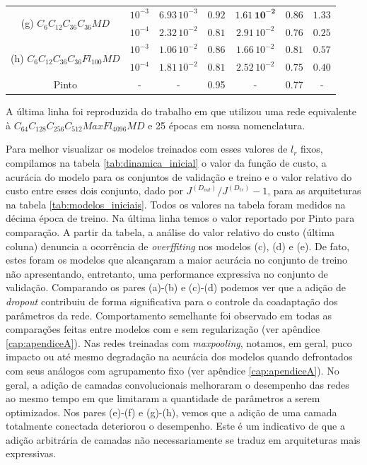 \begin{table}[ht]
\begin{center}
\begin{tabular}{ |c|c|c|c|c|c|c| }
			\hline\hline
			\multirow{2}{*}{(g) $C_6C_{12}C_{36}C_{36}MD$}
			& $10^{-3}$ & $6.93\,10^{-3}$ & $0.92$ & $\mathbf{1.61\,10^{-2}}$ & $\mathbf{0.86}$ & $1.33$ \\ \cline{2-7}
			& $10^{-4}$ & $2.32\,10^{-2}$ & $0.81$ & $2.91\,10^{-2}$ & $0.76$ & $\mathbf{0.25}$ \\ \cline{2-7}
			
			\hline\hline
			\multirow{2}{*}{(h) $C_6C_{12}C_{36}C_{36}Fl_{100}MD$}
			& $10^{-3}$ & $1.06\,10^{-2}$ & $0.86$ & $1.66\,10^{-2}$ & $0.81$ & $0.57$ \\ \cline{2-7}
			& $10^{-4}$ & $1.81\,10^{-2}$ & $0.81$ & $2.52\,10^{-2}$ & $0.75$ & $0.40$ \\ \cline{2-7}
			\hline\hline
			Pinto\cite{otaro} & - & - & 0.95 & - & 0.77 &  - \\ \cline{2-7} \hline
		\end{tabular}\hfill%
	\end{center}
	\small A última linha foi reproduzida do trabalho em \cite{otaro} que utilizou uma rede equivalente à $C_{64}C_{128}C_{256}C_{512}MaxFl_{4096}MD$ e 25 épocas em nossa nomenclatura.
\end{table}

Para melhor visualizar os modelos treinados com esses valores de $l_r$ fixos, compilamos na tabela \ref{tab:dinamica_inicial} o valor da função de custo, a acurácia do modelo para os conjuntos de validação e treino e o valor relativo do custo entre esses dois conjunto, dado por $J^{(D_{val})}/J^{(D_{tr})} - 1$, para as arquiteturas na tabela \ref{tab:modelos_iniciais}. Todos os valores na tabela foram medidos na décima época de treino. Na última linha temos o valor reportado por Pinto\cite{otaro} para comparação. A partir da tabela, a análise do valor relativo do custo (última coluna) denuncia a ocorrência de \textit{overffiting} nos modelos (c), (d) e (e). De fato, estes foram os modelos que alcançaram a maior acurácia no conjunto de treino não apresentando, entretanto, uma performance expressiva no conjunto de validação. Comparando os pares (a)-(b) e (c)-(d) podemos ver que a adição de \textit{dropout} contribuiu de forma significativa para o controle da coadaptação dos parâmetros da rede. Comportamento semelhante foi observado em todas as comparações feitas entre modelos com e sem regularização (ver apêndice \ref{cap:apendiceA}). Nas redes treinadas com \textit{maxpooling}, notamos, em geral, puco impacto ou até mesmo degradação na acurácia dos modelos quando defrontados com seus análogos com agrupamento fixo (ver apêndice \ref{cap:apendiceA}). No geral, a adição de camadas convolucionais melhoraram o desempenho das redes ao mesmo tempo em que limitaram a quantidade de parâmetros a serem optimizados. Nos pares (e)-(f) e (g)-(h), vemos que a adição de uma camada totalmente conectada deteriorou o desempenho. Este é um indicativo de que a adição arbitrária de camadas não necessariamente se traduz em arquiteturas mais expressivas.

